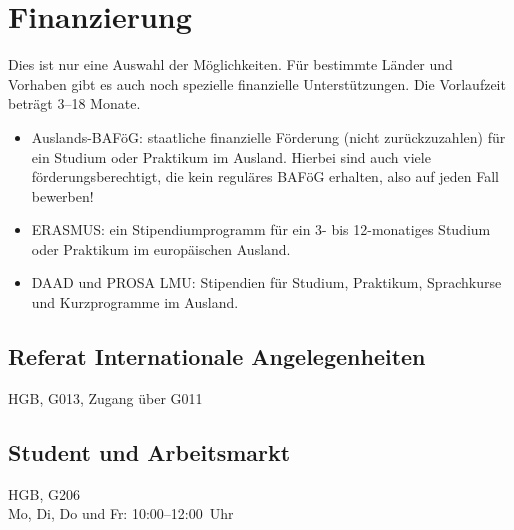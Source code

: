 \begin{urlList}
\end{urlList}

\section{Finanzierung}

Dies ist nur eine Auswahl der Möglichkeiten. Für bestimmte Länder und
Vorhaben gibt es auch noch spezielle finanzielle Unterstützungen. Die
Vorlaufzeit beträgt 3--18 Monate.

\begin{itemize}
\item Auslands-BAFöG: staatliche finanzielle Förderung (nicht zurückzuzahlen) für ein Studium oder Praktikum im Ausland. Hierbei sind auch viele förderungsberechtigt, die kein reguläres BAFöG erhalten, also auf jeden Fall bewerben!
\item ERASMUS: ein Stipendiumprogramm für ein 3- bis 12-monatiges Studium oder Praktikum im europäischen Ausland.
\item DAAD und PROSA LMU: Stipendien für Studium, Praktikum, Sprachkurse und Kurzprogramme im Ausland.
\end{itemize}

\subsection*{Referat Internationale Angelegenheiten}
HGB, G013, Zugang über G011

\begin{urlList}
\end{urlList}

\subsection*{Student und Arbeitsmarkt}

HGB, G206\\
Mo, Di, Do und Fr: 10:00--12:00~Uhr

\begin{urlList}
\end{urlList}

